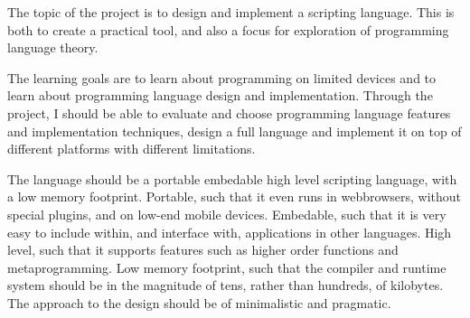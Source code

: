 
The topic of the project is to design and implement a scripting language.
This is both to create a practical tool, 
and also a focus for exploration of programming language theory.

The learning goals are to learn about programming on limited devices and to learn about programming language design and implementation. 
Through the project, I should be able to evaluate and choose programming language features and implementation techniques, design a full language and implement it on top of different platforms with different limitations.

The language should be a portable embedable high level scripting language, with a low memory footprint. 
Portable, such that it even runs in webbrowsers, without special plugins, and on low-end mobile devices. 
Embedable, such that it is very easy to include within, and interface with, applications in other languages.
High level, such that it supports features such as higher order functions and metaprogramming.
Low memory footprint, such that the compiler and runtime system should be in the magnitude of tens, rather than hundreds, of kilobytes.
The approach to the design should be of minimalistic and pragmatic.





